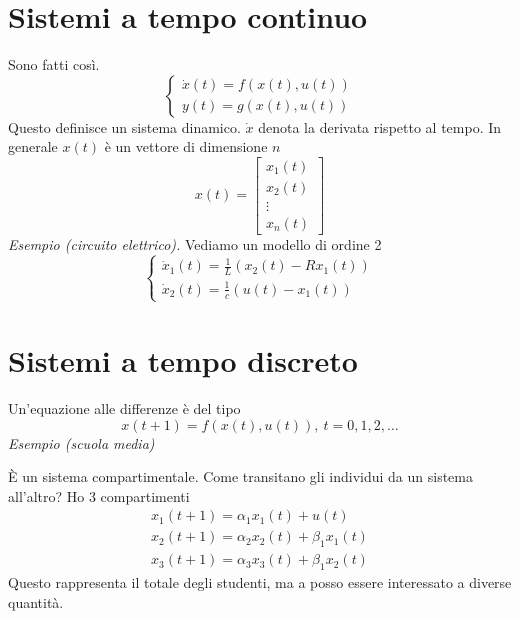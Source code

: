 \documentclass[10pt,a4paper]{book}
\begin{document}
\section{Sistemi a tempo continuo}

Sono fatti così.
\begin{equation*}
	\boxed{
		\begin{cases}
			\dot{x} (t)=f(x(t),u(t)) \\
			y(t)=g(x(t),u(t) )      
		\end{cases}
	}
\end{equation*}
Questo definisce un sistema dinamico. $\dot{x}$ denota la derivata rispetto al tempo. In generale $x(t)$ è un vettore di dimensione $n$
\begin{equation*}
	x(t) =\begin{bmatrix}
	x_1(t)\\
	x_2(t)\\
	\vdots \\
	x_n(t)
	\end{bmatrix}
\end{equation*}
\textit{Esempio (circuito elettrico).} Vediamo un modello di ordine 2
\begin{equation*}
	\begin{cases}
		\dot{x}_1 (t)=\frac{1}{L}( x_2 (t)-Rx_1 (t)) \\
		\dot{x}_2 (t)=\frac{1}{c}( u(t)-x_1 (t))       
	\end{cases}
\end{equation*}
\section{Sistemi a tempo discreto}

Un'equazione alle differenze è del tipo
\begin{equation*}
x( t+1) =f( x(t) ,u(t)) ,\ t=0,1,2,\dotsc 
\end{equation*}
\textit{Esempio (scuola media)}

È un sistema compartimentale. Come transitano gli individui da un sistema all'altro? Ho 3 compartimenti
\begin{equation*}
\begin{array}{ l }
x_1 (t+1)=\alpha _1 x_1 (t)+u(t)\\
x_2 (t+1)=\alpha _2 x_2 (t)+\beta _1 x_1 (t)\\
x_3 (t+1)=\alpha _3 x_3 (t)+\beta _1 x_2 (t)
\end{array}
\end{equation*}
Questo rappresenta il totale degli studenti, ma a posso essere interessato a diverse quantità.
\end{document}
